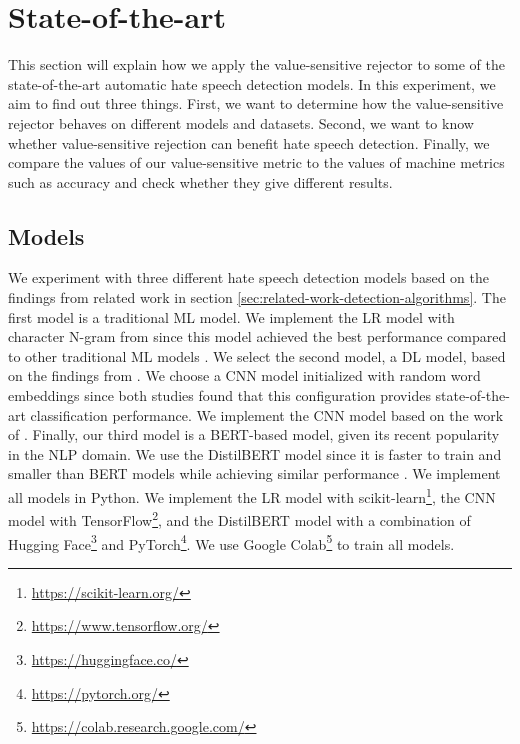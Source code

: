 \section{State-of-the-art}
\label{sec:state-of-the-art}
This section will explain how we apply the value-sensitive rejector to some of the state-of-the-art automatic hate speech detection models.
%
In this experiment, we aim to find out three things.
%
First, we want to determine how the value-sensitive rejector behaves on different models and datasets.
%
Second, we want to know whether value-sensitive rejection can benefit hate speech detection.
%
Finally, we compare the values of our value-sensitive metric to the values of machine metrics such as accuracy and check whether they give different results.
%

\subsection{Models}
We experiment with three different hate speech detection models based on the findings from related work in section \ref{sec:related-work-detection-algorithms}.
%
The first model is a traditional ML model.
%
We implement the LR model with character N-gram from \citet{waseem2016hateful} since this model achieved the best performance compared to other traditional ML models \citep{davidson2017automated}.
%
We select the second model, a DL model, based on the findings from \citet{agrawal2018deep, badjatiya2017deep}.
%
We choose a CNN model initialized with random word embeddings since both studies found that this configuration provides state-of-the-art classification performance.
%
We implement the CNN model based on the work of \citep{agrawal2018deep}.
%
Finally, our third model is a BERT-based model, given its recent popularity in the NLP domain.
%
We use the DistilBERT model since it is faster to train and smaller than BERT models while achieving similar performance \citep{sanh2019distilbert}.
We implement all models in Python.
%
We implement the LR model with scikit-learn\footnote{\url{https://scikit-learn.org/}}, the CNN model with TensorFlow\footnote{\url{https://www.tensorflow.org/}}, and the DistilBERT model with a combination of Hugging Face\footnote{\url{https://huggingface.co/}} and PyTorch\footnote{\url{https://pytorch.org/}}.
%
We use Google Colab\footnote{\url{https://colab.research.google.com/}} to train all models.
%

